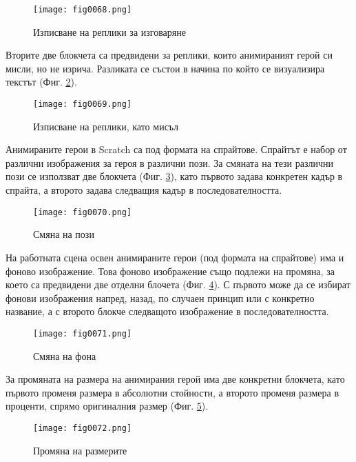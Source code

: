 \begin{figure}[H]
  \centering
  \texttt{[image: fig0068.png]}
  \caption{Изписване на реплики за изговаряне}
\label{fig0068}
\end{figure}

Вторите две блокчета са предвидени за реплики, които анимираният герой си мисли, но не изрича. Разликата се състои в начина по който се визуализира текстът (Фиг. \ref{fig0069}).

\begin{figure}[H]
  \centering
  \texttt{[image: fig0069.png]}
  \caption{Изписване на реплики, като мисъл}
\label{fig0069}
\end{figure}

Анимираните герои в Scratch са под формата на спрайтове. Спрайтът е набор от различни изображения за героя в различни пози. За смяната на тези различни пози се използват две блокчета (Фиг. \ref{fig0070}), като първото задава конкретен кадър в спрайта, а второто задава следващия кадър в последователността.

\begin{figure}[H]
  \centering
  \texttt{[image: fig0070.png]}
  \caption{Смяна на пози}
\label{fig0070}
\end{figure}

На работната сцена освен анимираните герои (под формата на спрайтове) има и фоново изображение. Това фоново изображение също подлежи на промяна, за което са предвидени две отделни блочета (Фиг. \ref{fig0071}). С първото може да се избират фонови изображения напред, назад, по случаен принцип или с конкретно название, а с второто блокче следващото изображение в последователността. 

\begin{figure}[H]
  \centering
  \texttt{[image: fig0071.png]}
  \caption{Смяна на фона}
\label{fig0071}
\end{figure}

За промяната на размера на анимирания герой има две конкретни блокчета, като първото променя размера в абсолютни стойности, а второто променя размера в проценти, спрямо оригиналния размер (Фиг. \ref{fig0072}).

\begin{figure}[H]
  \centering
  \texttt{[image: fig0072.png]}
  \caption{Промяна на размерите}
\label{fig0072}
\end{figure}




